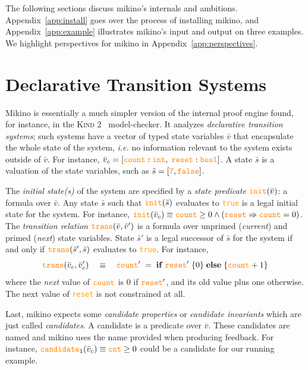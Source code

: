 \documentclass{easychair}
\newcommand{\Mkn}{Mikino}
\newcommand{\mkn}{mikino}
\newcommand{\ita}[1]{\textit{#1}}
\newcommand{\mbld}[1]{\mathbf{#1}}
\newcommand{\code}[1]{\textcolor{orange}{\texttt{#1}}}
\newcommand{\appref}[1]{Appendix~\ref{#1}}
\newcommand{\vars}{\bar{v}}
\newcommand{\state}{\bar{s}}
\newcommand{\tyint}{\code{int}}
\newcommand{\tybool}{\code{bool}}
\newcommand{\init}{\code{init}}
\newcommand{\trans}{\code{trans}}
\newcommand{\cand}{\code{candidate}}
\newcommand{\true}{\code{true}}
\newcommand{\false}{\code{false}}
\newcommand{\num}[1]{\code{#1}}
\newcommand{\impl}{\Rightarrow}
\begin{document}
The following sections discuss \mkn{}'s internals and ambitions. \appref{app:install} goes over the
process of installing \mkn{}, and \appref{app:example} illustrates \mkn{}'s input and output on
three examples. We highlight perspectives for \mkn{} in \appref{app:perspectives}.


\section{Declarative Transition Systems}%
\label{sec:input}

\Mkn{} is essentially a much simpler version of the internal proof engine found, for instance, in
the \textsc{Kind} 2~\cite{kind2} model-checker. It analyzes \ita{declarative transition systems};
such systems have a vector of typed state variables \(\vars\) that encapsulate the whole state of
the system, \ita{i.e.} no information relevant to the system exists outside of \(\vars\). For
instance, \(\vars_c = [\code{count}: \tyint,\; \code{reset}: \tybool]\). A state \(\state\) is a
valuation of the state variables, such as \(\state = [\num{7}, \false]\).

The \ita{initial state(s)} of the system are specified by a \ita{state predicate} \(\init(\vars)\):
a formula over \(\vars\). Any state \(\state\) such that \(\init(\state)\) evaluates to \true{} is
a legal initial state for the system. For instance, \(\init(\vars_c) \equiv \code{count} \geq 0
\land (\code{reset} \impl \code{count} = 0)\).
%
The \ita{transition relation} \(\trans(\vars, \vars')\) is a formula over unprimed (\ita{current})
and primed (\ita{next}) state variables. State \(\state'\) is a legal successor of \(\state\) for
the system if and only if \(\trans(\state', \state)\) evaluates to \true{}. For instance, \[
    \trans(\vars_c, \vars'_c) \quad\equiv\quad
    \code{count}' \;=\;
        \mbld{if} \; \code{reset}' \; \{ 0 \} \;
        \mbld{else} \; \{ \code{count} + 1 \}
\]
where the \ita{next} value of \(\code{count}\) is \(0\) if \(\code{reset}'\), and its old value
plus one otherwise. The next value of \code{reset} is not constrained at all.

Last, \mkn{} expects some \ita{candidate properties} or \ita{candidate invariants} which are just
called \ita{candidates}. A candidate is a predicate over \(\vars\). These candidates are named and
\mkn{} uses the name provided when producing feedback. For instance,%
%
\( \cand_1(\vars_c) \equiv \code{cnt} \geq 0 \)
%
could be a candidate for our running example.
\end{document}
